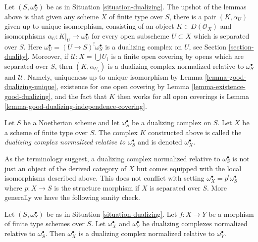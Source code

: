 \noindent
Let $(S, \omega_S^\bullet)$ be as in Situation \ref{situation-dualizing}.
The upshot of the lemmas above is that given any scheme $X$ of finite type
over $S$, there is a pair $(K, \alpha_U)$ given up to unique isomorphism,
consisting of an object $K \in D(\mathcal{O}_X)$ and isomorphisms
$\alpha_U : K|_U \to \omega_U^\bullet$ for every open subscheme
$U \subset X$ which is separated over $S$. Here
$\omega_U^\bullet = (U \to S)^!\omega_S^\bullet$ is a dualizing
complex on $U$, see Section \ref{section-duality}. Moreover, if
$\mathcal{U} : X = \bigcup U_i$ is a finite open covering
by opens which are separated over $S$, then
$(K, \alpha_{U_i})$ is a dualizing complex normalized relative to
$\omega_S^\bullet$ and $\mathcal{U}$.
Namely, uniqueness up to unique isomorphism by
Lemma \ref{lemma-good-dualizing-unique},
existence for one open covering by
Lemma \ref{lemma-existence-good-dualizing}, and
the fact that $K$ then works for all open coverings is
Lemma \ref{lemma-good-dualizing-independence-covering}.

\begin{definition}
\label{definition-good-dualizing}
Let $S$ be a Noetherian scheme and let $\omega_S^\bullet$ be a dualizing
complex on $S$. Let $X$ be a scheme of finite type over $S$.
The complex $K$ constructed above is called the
{\it dualizing complex normalized relative to $\omega_S^\bullet$}
and is denoted $\omega_X^\bullet$.
\end{definition}

\noindent
As the terminology suggest, a dualizing complex normalized relative to
$\omega_S^\bullet$ is not just an object of the derived category of $X$
but comes equipped with the local isomorphisms described above.
This does not conflict with setting
$\omega_X^\bullet = p^!\omega_S^\bullet$ where $p : X \to S$ is the
structure morphism if $X$ is separated over $S$. More generally
we have the following sanity check.

\begin{lemma}
\label{lemma-good-over-both}
Let $(S, \omega_S^\bullet)$ be as in Situation \ref{situation-dualizing}.
Let $f : X \to Y$ be a morphism of finite type schemes over $S$.
Let $\omega_X^\bullet$ and $\omega_Y^\bullet$ be dualizing complexes
normalized relative to $\omega_S^\bullet$. Then $\omega_X^\bullet$
is a dualizing complex normalized relative to $\omega_Y^\bullet$.
\end{lemma}

